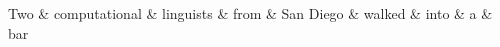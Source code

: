 \documentclass{standalone}
\begin{document}

\begin{dependency}[theme = simple]
   \begin{deptext}[column sep=1em]
      Two \& computational \& linguists \& from \& San Diego \& walked \& into \& a \& bar \\
   \end{deptext}
\end{dependency}
\end{document}
